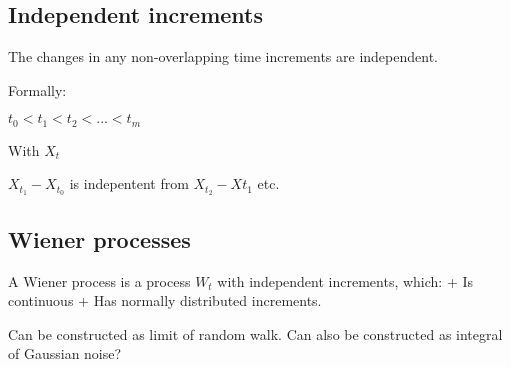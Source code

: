 
\subsection{Independent increments}

The changes in any non-overlapping time increments are independent.

Formally:

\(t_0<t_1<t_2<...<t_m\)

With \(X_t\)

\(X_{t_1}-X_{t_0}\) is indepentent from \(X_{t_2}-X{t_1}\) etc.

\subsection{Wiener processes}

A Wiener process is a process \(W_t\) with independent increments, which:
+ Is continuous
+ Has normally distributed increments.

Can be constructed as limit of random walk.
Can also be constructed as integral of Gaussian noise?

